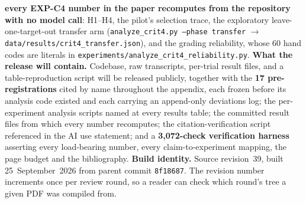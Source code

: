\documentclass{article} %
\begin{document}
\textbf{every EXP-C4 number in the paper recomputes from the repository with no model
call}: H1--H4, the pilot's selection trace, the exploratory leave-one-target-out
transfer arm (\texttt{analyze\_crit4.py --phase transfer} $\to$
\texttt{data/results/crit4\_transfer.json}), and the grading reliability, whose 60
hand codes are literals in \texttt{experiments/analyze\_crit4\_reliability.py}.
\textbf{What the release will contain.} Codebase, raw
transcripts, per-trial result files, and a table-reproduction script will be
released publicly, together with the \textbf{17 pre-registrations} cited by name
throughout the appendix, each frozen before its analysis code existed and each
carrying an append-only deviations log; the per-experiment analysis scripts named
at every results table; the committed result files from which every number
recomputes; the citation-verification script referenced in the AI use statement;
and a \textbf{3{,}072-check verification harness} asserting every load-bearing
number, every claim-to-experiment mapping, the page budget and the bibliography.
\textbf{Build identity.} Source revision~39, built 25~September~2026 from parent
commit \texttt{8f18687}. The revision number increments once per review round, so
a reader can check which round's tree a given PDF was compiled from.




\newpage
\appendix
\renewcommand\thesection{\AlphAlph{\value{section}}}

\end{document}
